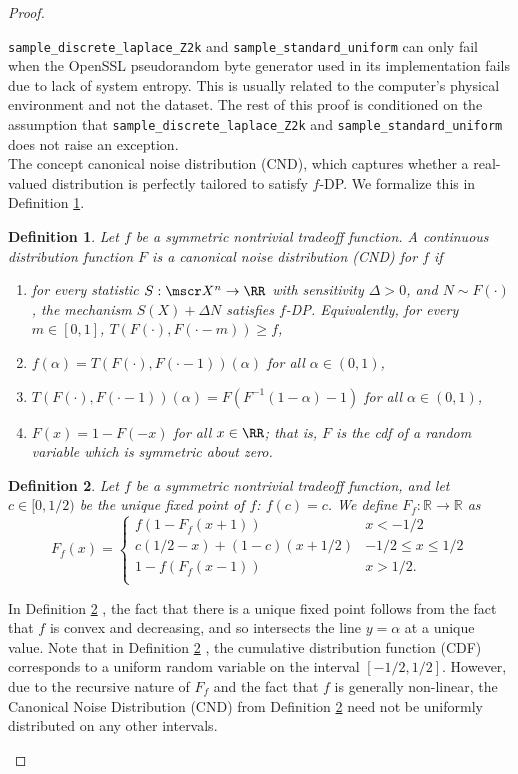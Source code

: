 \documentclass{article}
\newtheorem{defn}{Definition}
\begin{document}
\begin{proof}
\begin{enumerate}
    \texttt{sample\_discrete\_laplace\_Z2k} and \texttt{sample\_standard\_uniform} can only fail when the OpenSSL pseudorandom byte generator used in its implementation fails due to lack of system entropy. 
    This is usually related to the computer's physical environment and not the dataset. 
    The rest of this proof is conditioned on the assumption that \texttt{sample\_discrete\_laplace\_Z2k} and \texttt{sample\_standard\_uniform} does not raise an exception. \\
    The concept canonical noise distribution (CND)\parencite{awan2023canonical}, which captures whether a real-valued distribution is perfectly tailored to satisfy $f$-DP\parencite{dong2019gaussian}. We formalize this in Definition \ref{def2}\parencite{awan2023canonical}. 
    \begin{defn}\label{def2}  %
    Let $f$ be a symmetric nontrivial tradeoff function. A {continuous} distribution function $F$ is a \emph{canonical noise distribution} (CND) for $f$ if 
    \begin{enumerate}[(1)]
    \item for every statistic $S:\mscr X^n\rightarrow \RR$ with sensitivity $\Delta>0$, and $N\sim F(\cdot)$, the mechanism $S(X) + \Delta N$ satisfies $f$-DP. Equivalently, for every $m\in [0,1]$, $T(F(\cdot),F(\cdot-m))\geq f$,
    \item $f(\alpha)=T(F(\cdot),F(\cdot-1))(\alpha)$ for all $\alpha \in (0,1)$,
    \item $T(F(\cdot),F(\cdot-1))(\alpha) = F(F^{-1}(1-\alpha)-1)$ for all $\alpha \in (0,1)$,
    \item $F(x) = 1-F(-x)$ for all $x\in \RR$; that is, $F$ is the cdf of a random variable which is symmetric about zero.
    \end{enumerate}
    \end{defn}
    \begin{defn} \label{def1}  %
    Let $f$ be a symmetric nontrivial tradeoff function, and let {$c\in [0,1/2)$} be the unique fixed point of $f$: $f(c)=c$. We define $F_f:\mathbb{R}\rightarrow \mathbb{R}$ as  \[ F_f(x) = \begin{cases}
    f(1-F_f(x+1))&x<-1/2\\
    c(1/2-x) + (1-c)(x+1/2)&-1/2\leq x\leq 1/2\\
    1-f(F_f(x-1))&x>1/2.\\
    \end{cases}\]
    \end{defn}
    In Definition \ref{def1} \parencite{awan2023canonical}, the fact that there is a unique fixed point follows from the fact that $f$ is convex and decreasing, and so intersects the line $y=\alpha$ at a unique value. Note that in Definition \ref{def1} \parencite{awan2023canonical}, the cumulative distribution function (CDF) corresponds to a uniform random variable on the interval $[-1/2,1/2]$. However, due to the recursive nature of $F_f$ and the fact that $f$ is generally non-linear, the Canonical Noise Distribution (CND) from Definition \ref{def1} \parencite{awan2023canonical} need not be uniformly distributed on any other intervals.


\end{enumerate}
\end{proof}
\end{document}
